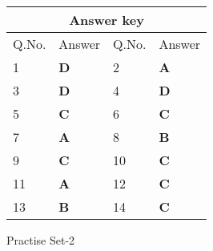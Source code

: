 \begin{table}[H]
	\centering
	\begin{tabular}{|p{1.5cm}|p{1.5cm}||p{1.5cm}|p{1.5cm}|}
		\hline
		\multicolumn{4}{|c|}{\textbf{Answer key}}\\\hline\hline
		\rowcolor{ocrel}Q.No.&Answer&Q.No.&Answer\\\hline
		1&\textbf{D} &2&\textbf{A}\\\hline 
		3&\textbf{D} &4&\textbf{D} \\\hline
		5&\textbf{C} &6&\textbf{C} \\\hline
		7&\textbf{A}&8&\textbf{B}\\\hline
		9&\textbf{C}&10&\textbf{C}\\\hline
		11&\textbf{A} &12&\textbf{C}\\\hline
		13&\textbf{B}&14&\textbf{C}\\\hline
	\end{tabular}
\end{table}
\newpage
\begin{abox}
	Practise Set-2
\end{abox}
